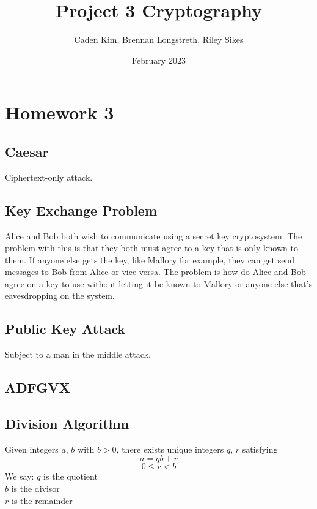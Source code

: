 \documentclass{article}
\title{Project 3 Cryptography}
\author{Caden Kim, Brennan Longstreth, Riley Sikes }
\date{February 2023}
\begin{document}
\maketitle

\section{Homework 3}

\subsection{Caesar}

Ciphertext-only attack.

\subsection{Key Exchange Problem}

Alice and Bob both wish to communicate using a secret key cryptosystem. The problem with this is that they both must agree to a key that is only known to them. If anyone else gets the key, like Mallory for example, they can get send messages to Bob from Alice or vice versa. The problem is how do Alice and Bob agree on a key to use without letting it be known to Mallory or anyone else that's eavesdropping on the system.

\subsection{Public Key Attack}

Subject to a man in the middle attack.

\subsection{ADFGVX}

\subsection{Division Algorithm}

Given integers $a$, $b$ with $b > 0$, there exists unique integers $q$, $r$ satisfying $$a = qb + r$$
$$0 \le r < b$$
We say: $q$ is the quotient\\
$b$ is the divisor\\
$r$ is the remainder\\
\end{document}
